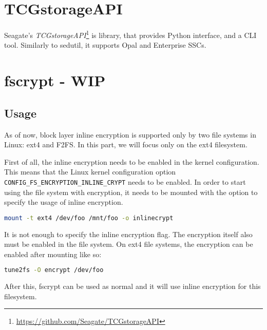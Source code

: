 \section{TCGstorageAPI}

Seagate's \emph{TCGstorageAPI}\footnote{\url{https://github.com/Seagate/TCGstorageAPI}} is library, that provides Python interface, and a CLI tool. Similarly to sedutil, it supports Opal and Enterprise SSCs.





\section{fscrypt - WIP}


\subsection{Usage}

As of now, block layer inline encryption is supported only by two file systems in Linux: ext4 and F2FS. 
In this part, we will focus only on the ext4 filesystem.

First of all, the inline encryption needs to be enabled in the kernel configuration. This means that the Linux kernel configuration option \verb|CONFIG_FS_ENCRYPTION_INLINE_CRYPT| needs to be enabled.
In order to start using the file system with encryption, it needs to be mounted with the option to specify the usage of inline encryption. 
\begin{lstlisting}[language=bash]
mount -t ext4 /dev/foo /mnt/foo -o inlinecrypt
\end{lstlisting}
It is not enough to specify the inline encryption flag. The encryption itself also must be enabled in the file system. On ext4 file systems, the encryption can be enabled after mounting like so:
\begin{lstlisting}[language=bash]
tune2fs -O encrypt /dev/foo
\end{lstlisting}
After this, fscrypt can be used as normal and it will use inline encryption for this filesystem.

